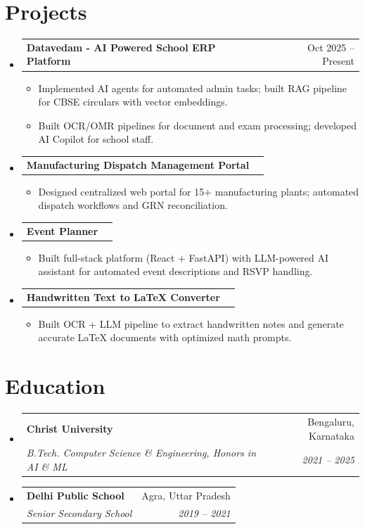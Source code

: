 \documentclass[letterpaper,10pt]{article}
\makeatletter
\newcommand{\resumeItem}[1]{
  \item\small{
    {#1 \vspace{-1pt}}
  }
}
\newcommand{\resumeSubheading}[4]{
  \vspace{-1pt}\item
    \begin{tabular*}{0.97\textwidth}[t]{l@{\extracolsep{\fill}}r}
      \textbf{#1} & #2 \\
      \textit{\small #3} & \textit{\small #4} \\
    \end{tabular*}\vspace{-5pt}
}
\newcommand{\resumeProjectHeading}[2]{
    \item
    \begin{tabular*}{0.97\textwidth}{l@{\extracolsep{\fill}}r}
      \small#1 & #2 \\
    \end{tabular*}\vspace{-1pt}
}
\newcommand{\resumeSubHeadingListStart}{\begin{itemize}[leftmargin=0.15in, label={}]}
\newcommand{\resumeSubHeadingListEnd}{\end{itemize}\vspace{-5pt}}
\newcommand{\resumeItemListStart}{\begin{itemize}\vspace{-3pt}}
\newcommand{\resumeItemListEnd}{\end{itemize}\vspace{-2pt}}
\makeatother
\begin{document}
\section{Projects}
\resumeSubHeadingListStart
    \resumeProjectHeading
      {\textbf{Datavedam - AI Powered School ERP Platform}}{Oct 2025 -- Present}
      \resumeItemListStart
        \resumeItem{Implemented AI agents for automated admin tasks; built RAG pipeline for CBSE circulars with vector embeddings.}
        \resumeItem{Built OCR/OMR pipelines for document and exam processing; developed AI Copilot for school staff.}
      \resumeItemListEnd
    \resumeProjectHeading
      {\textbf{Manufacturing Dispatch Management Portal}}{}
      \resumeItemListStart
        \resumeItem{Designed centralized web portal for 15+ manufacturing plants; automated dispatch workflows and GRN reconciliation.}
      \resumeItemListEnd
    \resumeProjectHeading
      {\textbf{Event Planner}}{}
      \resumeItemListStart
        \resumeItem{Built full-stack platform (React + FastAPI) with LLM-powered AI assistant for automated event descriptions and RSVP handling.}
      \resumeItemListEnd
    \resumeProjectHeading
      {\textbf{Handwritten Text to LaTeX Converter}}{}
      \resumeItemListStart
        \resumeItem{Built OCR + LLM pipeline to extract handwritten notes and generate accurate LaTeX documents with optimized math prompts.}
      \resumeItemListEnd
\resumeSubHeadingListEnd

\section{Education}
\resumeSubHeadingListStart
    \resumeSubheading
      {Christ University}{Bengaluru, Karnataka}
      {B.Tech. Computer Science \& Engineering, Honors in AI \& ML}{2021 -- 2025}
    \resumeSubheading
      {Delhi Public School}{Agra, Uttar Pradesh}
      {Senior Secondary School}{2019 -- 2021}
\resumeSubHeadingListEnd
\end{document}
